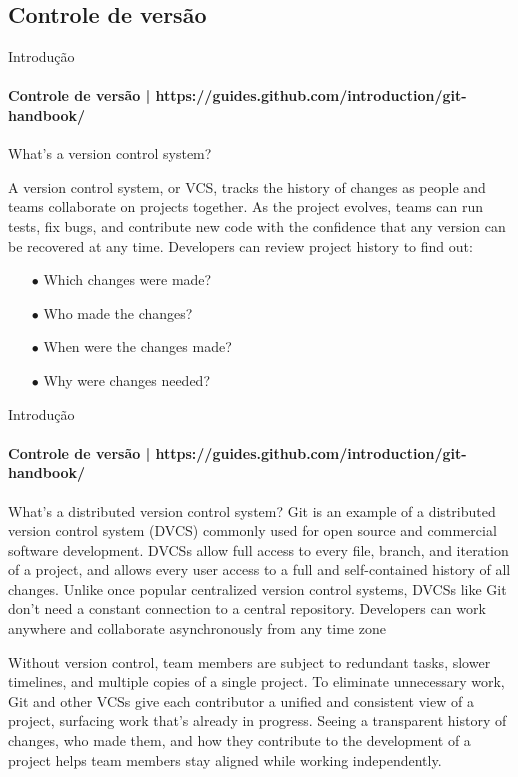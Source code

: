 \documentclass[xcolor=dvipsnames,t]{beamer}
\begin{document}
\subsection{Controle de versão}
\begin{frame}{Introdução}
\framesubtitle{Controle de versão | https://guides.github.com/introduction/git-handbook/}
What’s a version control system?

A version control system, or VCS, tracks the history of changes as people and teams collaborate on projects together. As the project evolves, teams can run tests, fix bugs, and contribute new code with the confidence that any version can be recovered at any time. Developers can review project history to find out:

\begin{itemize}
	\item[$ \bullet $] Which changes were made?
	\item[$ \bullet $] Who made the changes?
	\item[$ \bullet $] When were the changes made?
	\item[$ \bullet $] Why were changes needed?
\end{itemize}

\end{frame}

\begin{frame}{Introdução}
\framesubtitle{Controle de versão | https://guides.github.com/introduction/git-handbook/}
\small

\begin{exampleblock}{What’s a distributed version control system?}
	Git is an example of a distributed version control system (DVCS) commonly used for open source and commercial software development. DVCSs allow full access to every file, branch, and iteration of a project, and allows every user access to a full and self-contained history of all changes. Unlike once popular centralized version control systems, DVCSs like Git don’t need a constant connection to a central repository. Developers can work anywhere and collaborate asynchronously from any time zone
\end{exampleblock}

\begin{block}{}
	Without version control, team members are subject to redundant tasks, slower timelines, and multiple copies of a single project. To eliminate unnecessary work, Git and other VCSs give each contributor a unified and consistent view of a project, surfacing work that’s already in progress. Seeing a transparent history of changes, who made them, and how they contribute to the development of a project helps team members stay aligned while working independently.
\end{block}

\end{frame}
\end{document}
